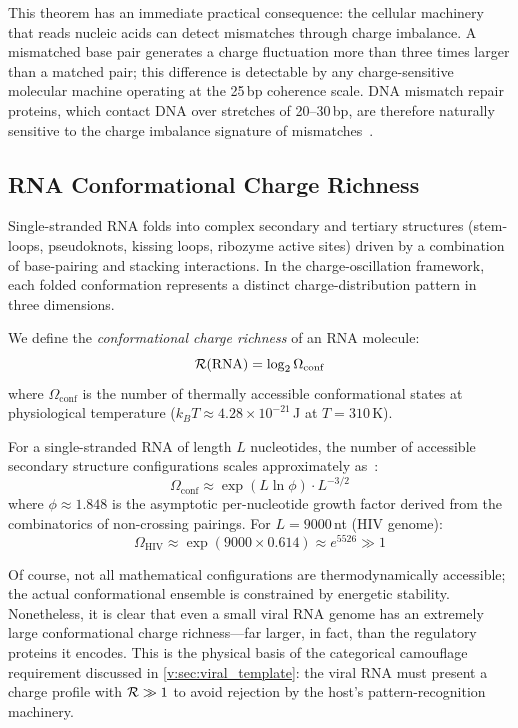 This theorem has an immediate practical consequence: the cellular machinery that reads nucleic acids can detect mismatches through charge imbalance. A mismatched base pair generates a charge fluctuation more than three times larger than a matched pair; this difference is detectable by any charge-sensitive molecular machine operating at the 25\,bp coherence scale. DNA mismatch repair proteins, which contact DNA over stretches of 20--30\,bp, are therefore naturally sensitive to the charge imbalance signature of mismatches~\cite{Erie2004,Modrich1994}.

\subsection{RNA Conformational Charge Richness}

Single-stranded RNA folds into complex secondary and tertiary structures (stem-loops, pseudoknots, kissing loops, ribozyme active sites) driven by a combination of base-pairing and stacking interactions. In the charge-oscillation framework, each folded conformation represents a distinct charge-distribution pattern in three dimensions.

We define the \emph{conformational charge richness} of an RNA molecule:
\begin{equation}
  \mathcal{R}(\mathrm{RNA}) = \log_2 \Omega_{\mathrm{conf}}
  \label{v:eq:RNA_richness}
\end{equation}
where $\Omega_{\mathrm{conf}}$ is the number of thermally accessible conformational states at physiological temperature ($k_BT \approx 4.28 \times 10^{-21}$\,J at $T = 310$\,K).

For a single-stranded RNA of length $L$ nucleotides, the number of accessible secondary structure configurations scales approximately as~\cite{Waterman1978,Zuker1989}:
\begin{equation}
  \Omega_{\mathrm{conf}} \approx \exp(L \ln \phi) \cdot L^{-3/2}
\end{equation}
where $\phi \approx 1.848$ is the asymptotic per-nucleotide growth factor derived from the combinatorics of non-crossing pairings. For $L = 9000$\,nt (HIV genome):
\begin{equation}
  \Omega_{\mathrm{HIV}} \approx \exp(9000 \times 0.614) \approx e^{5526} \gg 1
\end{equation}

Of course, not all mathematical configurations are thermodynamically accessible; the actual conformational ensemble is constrained by energetic stability. Nonetheless, it is clear that even a small viral RNA genome has an extremely large conformational charge richness---far larger, in fact, than the regulatory proteins it encodes. This is the physical basis of the categorical camouflage requirement discussed in \cref{v:sec:viral_template}: the viral RNA must present a charge profile with $\mathcal{R} \gg 1$ to avoid rejection by the host's pattern-recognition machinery.

